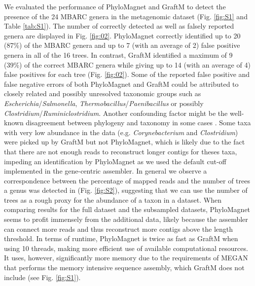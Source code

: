 \documentclass[a4paper]{article}
\begin{document}
We evaluated the performance of PhyloMagnet and GraftM to detect the presence of the 24 MBARC genera \citep[23 of those detectable, as Nocardiopsis was part of the pooled community but not present in the sequence data from][]{Singer2016} in the metagenomic dataset (Fig. \ref{fig:S1} and Table \ref{tab:S1}). The number of correctly detected as well as falsely reported genera are displayed in Fig. \ref{fig:02}. PhyloMagnet correctly identified up to 20 (87\%) of the MBARC genera and up to 7 (with an average of 2) false positive genera in all of the 16 trees. In contrast, GraftM identified a maximum of 9 (39\%) of the correct MBARC genera while giving up to 14 (with an average of 4) false positives for each tree (Fig. \ref{fig:02}). Some of the reported false positive and false negative errors of both PhyloMagnet and GraftM could be attributed to closely related and possibly unresolved taxonomic groups such as \textit{Escherichia}/\textit{Salmonella}, \textit{Thermobacillus}/\textit{Paenibacillus} or possibly \textit{Clostridium}/\textit{Ruminiclostridium}. Another confounding factor might be the well-known disagreement between phylogeny and taxonomy in some cases \citep[e.g. \textit{Escherichia}/\textit{Salmonella};][]{Retchless2010}.  Some taxa with very low abundance in the data (e.g. \textit{Corynebacterium} and \textit{Clostridium}) were picked up by GraftM but not PhyloMagnet, which is likely due to the fact that there are not enough reads to reconstruct longer contigs for theses taxa, impeding an identification by PhyloMagnet as we used the default cut-off implemented in the gene-centric assembler. In general we observe a correspondence between the percentage of mapped reads \citep{Singer2016} and the number of trees a genus was detected in (Fig. \ref{fig:S2}), suggesting that we can use the number of trees as a rough proxy for the abundance of a taxon in a dataset.  
When comparing results for the full dataset and the subsampled datasets, PhyloMagnet seems to profit immensely from the additional data, likely because the assembler can connect more reads and thus reconstruct more contigs above the length threshold.
In terms of runtime, PhyloMagnet is twice as fast as GraftM when using 10 threads, making more efficient use of available computational resources. It uses, however, significantly more memory due to the requirements of MEGAN that performs the memory intensive sequence assembly, which GraftM does not include (see Fig. \ref{fig:S1}).
\end{document}

